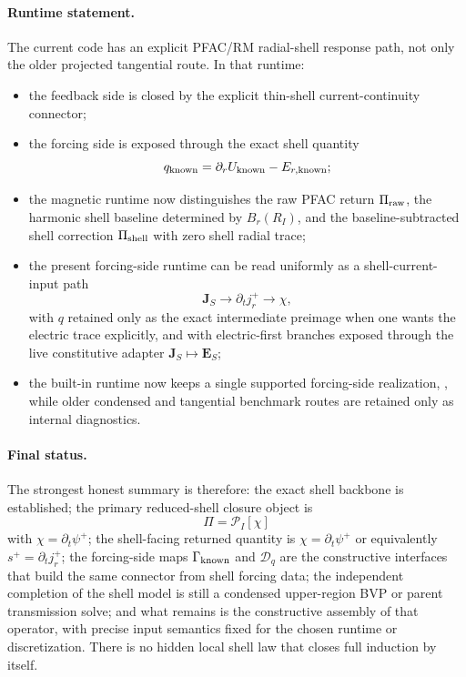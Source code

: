\documentclass[11pt,a4paper]{article}
\begin{document}
\paragraph{Runtime statement.}
The current code has an explicit PFAC/RM radial-shell response path, not only
the older projected tangential route. In that runtime:
\begin{itemize}
\item the feedback side is closed by the explicit thin-shell
current-continuity connector;
\item the forcing side is exposed through the exact shell quantity
\[
q_{\rm known}=\partial_r U_{\rm known}-E_{r,\rm known};
\]
\item the magnetic runtime now distinguishes the raw PFAC return
\(\Pi_{\rm raw}\), the harmonic shell baseline determined by
\(B_r(R_I)\), and the baseline-subtracted shell correction
\(\Pi_{\rm shell}\) with zero shell radial trace;
\item the present forcing-side runtime can be read uniformly as a
shell-current-input path
\[
\mathbf J_S \to \partial_t j_r^+ \to \chi,
\]
with \(q\) retained only as the exact intermediate preimage when one wants the
electric trace explicitly, and with electric-first branches exposed through the
live constitutive adapter \(\mathbf J_S \mapsto \mathbf E_S\);
\item the built-in runtime now keeps a single supported forcing-side
realization, , while older condensed and
tangential benchmark routes are retained only as internal diagnostics.
\end{itemize}

\paragraph{Final status.}
The strongest honest summary is therefore: the exact shell backbone is
established; the primary reduced-shell closure object is
\[
\Pi=\mathcal P_I[\chi]
\]
with \(\chi=\partial_t\psi^+\); the shell-facing returned quantity is
\(\chi=\partial_t\psi^+\) or equivalently \(s^+=\partial_t j_r^+\); the
forcing-side maps \(\Gamma_{\rm known}\) and \(\mathcal D_q\) are the
constructive interfaces that build the same connector from shell forcing data;
the independent completion of the shell model is still a condensed
upper-region BVP or parent transmission solve; and what remains is the
constructive assembly of that operator, with precise input semantics fixed for
the chosen runtime or discretization. There is no hidden local shell law that
closes full induction by itself.
\end{document}
